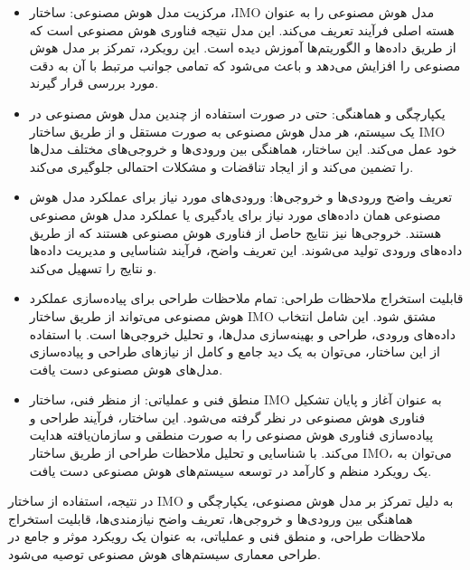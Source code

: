 \documentclass[a4paper,10pt]{article}
\begin{document}
            \begin{itemize}
                
                \item مرکزیت مدل هوش مصنوعی: ساختار ،IMO مدل هوش مصنوعی را به عنوان هسته اصلی فرآیند تعریف می‌کند. این مدل نتیجه فناوری هوش مصنوعی است که از طریق داده‌ها و الگوریتم‌ها آموزش دیده است. این رویکرد، تمرکز بر مدل هوش مصنوعی را افزایش می‌دهد و باعث می‌شود که تمامی جوانب مرتبط با آن به دقت مورد بررسی قرار گیرند.

                \item یکپارچگی و هماهنگی: حتی در صورت استفاده از چندین مدل هوش مصنوعی در یک سیستم، هر مدل هوش مصنوعی به صورت مستقل و از طریق ساختار IMO خود عمل می‌کند. این ساختار، هماهنگی بین ورودی‌ها و خروجی‌های مختلف مدل‌ها را تضمین می‌کند و از ایجاد تناقضات و مشکلات احتمالی جلوگیری می‌کند.
                
                \item تعریف واضح ورودی‌ها و خروجی‌ها: ورودی‌های مورد نیاز برای عملکرد مدل هوش مصنوعی همان داده‌های مورد نیاز برای یادگیری یا عملکرد مدل هوش مصنوعی هستند. خروجی‌ها نیز نتایج حاصل از فناوری هوش مصنوعی هستند که از طریق داده‌های ورودی تولید می‌شوند. این تعریف واضح، فرآیند شناسایی و مدیریت داده‌ها و نتایج را تسهیل می‌کند.
                
                \item قابلیت استخراج ملاحظات طراحی: تمام ملاحظات طراحی برای پیاده‌سازی عملکرد هوش مصنوعی می‌تواند از طریق ساختار IMO مشتق شود. این شامل انتخاب داده‌های ورودی، طراحی و بهینه‌سازی مدل‌ها، و تحلیل خروجی‌ها است. با استفاده از این ساختار، می‌توان به یک دید جامع و کامل از نیازهای طراحی و پیاده‌سازی مدل‌های هوش مصنوعی دست یافت.

                \item منطق فنی و عملیاتی: از منظر فنی، ساختار IMO به عنوان آغاز و پایان تشکیل فناوری هوش مصنوعی در نظر گرفته می‌شود. این ساختار، فرآیند طراحی و پیاده‌سازی فناوری هوش مصنوعی را به صورت منطقی و سازمان‌یافته هدایت می‌کند. با شناسایی و تحلیل ملاحظات طراحی از طریق ساختار IMO، می‌توان به یک رویکرد منظم و کارآمد در توسعه سیستم‌های هوش مصنوعی دست یافت.

            \end{itemize}

            در نتیجه، استفاده از ساختار IMO به دلیل تمرکز بر مدل هوش مصنوعی، یکپارچگی و هماهنگی بین ورودی‌ها و خروجی‌ها، تعریف واضح نیازمندی‌ها، قابلیت استخراج ملاحظات طراحی، و منطق فنی و عملیاتی، به عنوان یک رویکرد موثر و جامع در طراحی معماری سیستم‌های هوش مصنوعی توصیه می‌شود.
\end{document}
